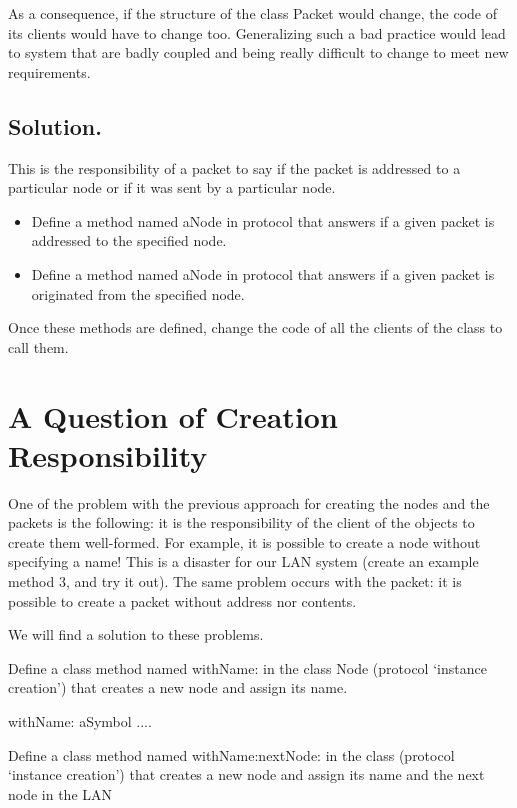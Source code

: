 As a consequence, if the structure of the class Packet would 
change, the code of its clients would have to change too. Generalizing 
such a bad practice would lead to system that are badly coupled 
and being really difficult to change to meet new requirements.



\subsection{Solution.}
This is the responsibility of a packet to say if the packet is 
addressed to a particular node or if it was sent by a particular 
node.
\begin{itemize}
\item Define a method named  aNode in  protocol that answers if a given packet is addressed to the specified node. 
\item Define a method named  aNode in  protocol that answers if a given packet is originated from the specified node. 
\end{itemize}
Once these methods are defined, change the code of all the clients of the class  to call them.




\section{A Question of Creation Responsibility}
One of the problem with the previous approach for creating the nodes and the packets is the following: it is the responsibility of the client of the objects to create  them well-formed. For example, it is possible to create a node  without specifying a name! This is a disaster for our LAN system (create an example method 3, and try it out). The same problem occurs with the packet: it is possible to create a packet without address nor contents.

We will find a solution to these problems.

\exercise  Define a class method named withName: in the class Node 
(protocol `instance creation') that creates a new node and assign 
its name.

\begin{scode}
withName: aSymbol
....

\end{scode}

Define a class method named withName:nextNode: in the class 
(protocol `instance creation') that creates a new node and assign 
its name and the next node in the LAN

